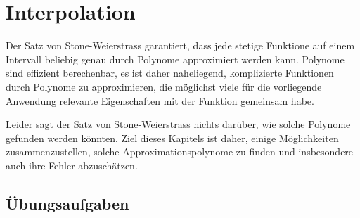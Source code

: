 %
%
%
\chapter{Interpolation\label{chapter:interpolation}}
\rhead{}
Der Satz von Stone-Weierstrass garantiert, dass jede stetige Funktione
auf einem Intervall beliebig genau durch Polynome approximiert werden
kann.
%
%
Polynome sind effizient berechenbar, es ist daher naheliegend,
komplizierte Funktionen durch Polynome zu approximieren, die möglichst
viele für die vorliegende Anwendung relevante Eigenschaften mit der
Funktion gemeinsam habe.
%

Leider sagt der Satz von Stone-Weierstrass nichts darüber, wie solche
Polynome gefunden werden könnten.
Ziel dieses Kapitels ist daher, einige Möglichkeiten zusammenzustellen,
solche Approximationspolynome zu finden und insbesondere auch ihre
Fehler abzuschätzen.
%







\section*{Übungsaufgaben}
\begin{uebungsaufgaben}
\end{uebungsaufgaben}
